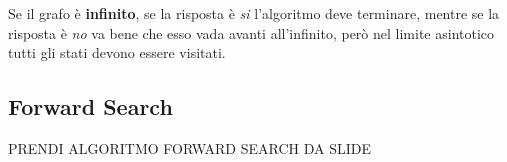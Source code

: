 \documentclass[\main/main.tex]{subfiles}
\begin{document}
Se il grafo è \textbf{infinito}, se la risposta è \textit{si} l'algoritmo deve terminare, mentre se la risposta è \textit{no} va bene che esso vada avanti all'infinito, però nel limite asintotico tutti gli stati devono essere visitati.

\subsection{Forward Search}

PRENDI ALGORITMO FORWARD SEARCH DA SLIDE
\end{document}
